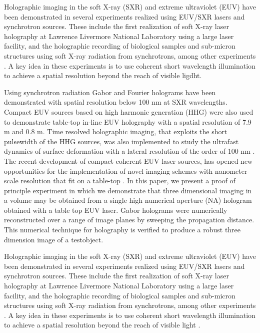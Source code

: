 \documentclass[]{IEEEphot}
\begin{document}
Holographic imaging in the soft X-ray (SXR) and extreme ultraviolet (EUV) have been demonstrated in several experiments realized using EUV/SXR lasers and synchrotron sources. These include the first realization of soft X-ray laser holography at Lawrence Livermore National Laboratory using a large laser facility, and the holographic recording of biological samples and sub-micron structures using soft X-ray radiation from synchrotrons, among other experiments \cite{Mizuuchi2002, Mizuuchi2003}.  A key idea in these experiments is to use coherent short wavelength illumination to achieve a spatial resolution beyond the reach of visible ligdht.  

Using synchrotron radiation Gabor and Fourier holograms have been demonstrated \cite{Mizuuchi2003}
 with spatial resolution below 100 nm at SXR wavelengths.  Compact EUV sources based on high harmonic generation (HHG) were also used to demonstrate table-top in-line EUV holography with a spatial resolution of 7.9 m  and 0.8 m.  Time resolved holographic imaging, that exploits the short pulsewidth of the HHG sources, was also implemented to study the ultrafast dynamics of surface deformation with a lateral resolution of the order of 100 nm \cite{Mizuuchi2005,Nakanishi2007}.  The recent development of compact coherent EUV laser sources, \cite{Ott2006} has opened new opportunities for the implementation of novel imaging schemes with nanometer-scale resolution that fit on a table-top \cite{Mizuuchi2003,Ott2006}. In this paper, we present a proof of principle experiment in which we demonstrate that three dimensional imaging in a volume may be obtained from a single high numerical  aperture (NA) hologram obtained with a table top EUV laser. Gabor holograms were numerically reconstructed over a range of image planes by sweeping the propagation distance. This numerical  technique for holography is verified to produce a robust three dimension image of a test\break object.  

Holographic imaging in the soft X-ray (SXR) and extreme ultraviolet (EUV) have \cite{Or2006a} been demonstrated in several experiments realized using EUV/SXR lasers and synchrotron sources. These include the first realization of soft X-ray laser holography at Lawrence Livermore National Laboratory using a large laser facility, and the holographic recording of biological samples and sub-micron structures using soft X-ray radiation from synchrotrons, among other experiments \cite{Or2007, Or2008}.  A key idea in these experiments is to use coherent short wavelength illumination to achieve a spatial resolution beyond the reach of visible light \cite{Or2005a}.  
\end{document}
